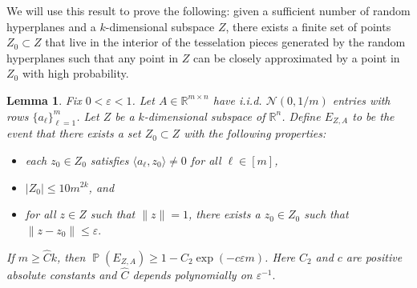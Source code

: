 \documentclass[11pt]{article}
\renewcommand{\epsilon}{\varepsilon}
\newcommand{\R}{\mathbb{R}}
\newcommand{\Pro}{\operatorname{\mathbb{P}}}
\renewcommand{\top}{{\mathrm{T}}}
\newtheorem{lem}{Lemma}
\theoremstyle{remark}
\begin{document}
We will use this result to prove the following: given a sufficient number of random hyperplanes and a $k$-dimensional subspace $Z$, there exists a finite set of points $Z_0 \subset Z$ that live in the interior of the tesselation pieces generated by the random hyperplanes such that any point in $Z$ can be closely approximated by a point in $Z_0$ with high probability.

\begin{lem} \label{Z_0lemma} Fix $0 < \epsilon < 1$. Let $A \in \R^{m \times n}$ have i.i.d. $\mathcal{N}(0,1/m)$ entries with rows $\{a_{\ell}\}_{\ell=1}^m$. Let $Z$ be a $k$-dimensional subspace of $\R^n$. Define $E_{Z,A}$ to be the event that there exists a set $Z_0 \subset Z$ with the following properties: \begin{itemize}
    \item each $z_0 \in Z_0$ satisfies $\langle a_{\ell}, z_0 \rangle  \neq 0$ for all $\ell \in [m]$,
    \item $|Z_0| \leqslant 10m^{2k}$, and 
    \item for all $z \in Z$ such that $\|z\|=1$, there exists a $z_0 \in Z_0$ such that $\|z-z_0\|\leqslant \epsilon.$
\end{itemize} If $m \geqslant \hat{C} k$, then $\Pro(E_{Z,A}) \geqslant 1 - C_2\exp(-c\epsilon m)$. %
  Here $C_2$ and $c$ are positive absolute constants and $\hat{C}$ depends polynomially on $\epsilon^{-1}.$
\end{lem}
\end{document}
